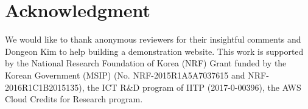 \documentclass[conference]{IEEEtran}
\begin{document}
\section*{Acknowledgment}
We would like to thank anonymous reviewers for their insightful comments and Dongeon Kim to help building a demonstration website. This work is supported by the National Research Foundation of Korea (NRF) Grant funded by the Korean Government (MSIP) (No. NRF-2015R1A5A7037615 and NRF-2016R1C1B2015135), the ICT R\&D program of IITP (2017-0-00396), the AWS Cloud Credits for Research program.





\end{document}
